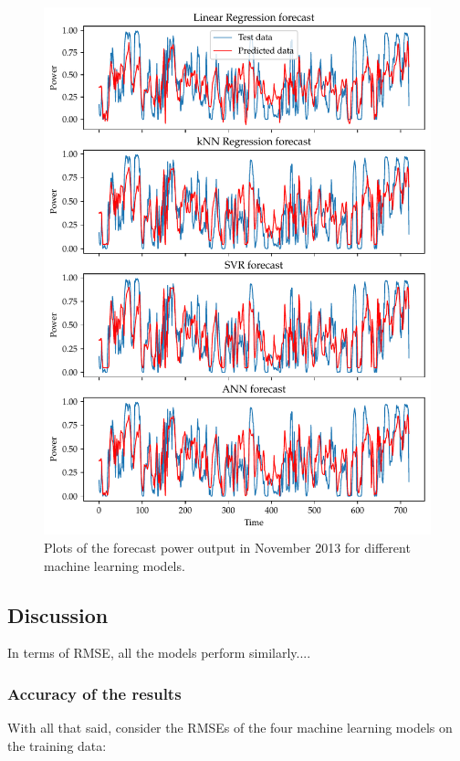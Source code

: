 \documentclass[11pt]{article}
\begin{document}
\begin{figure}
  \centering
  \includegraphics{figures/q1_forecast_plots}
  \caption{Plots of the forecast power output in November 2013 for different machine learning models.}
  \label{fig:q1-forecast-plots}
\end{figure}


\subsection*{Discussion}
In terms of RMSE, all the models perform similarly....

\subsubsection*{Accuracy of the results}
With all that said, consider the RMSEs of the four machine learning models on the training data:
\begin{center}
\end{center}
\end{document}
